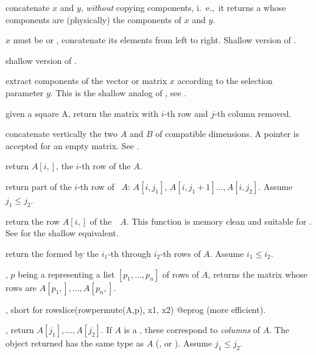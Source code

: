  concatenate $x$ and $y$, \emph{without}
copying components, i.~e.,~it returns a  whose components are
(physically) the components of $x$ and $y$.

$x$ must be  or , concatenate
its elements from left to right. Shallow version of .

 shallow version of .

 extract components
of the vector or matrix $x$ according to the selection parameter $y$.
This is the shallow analog of , see .

 given a square  A,
return the matrix with $i$-th row and $j$-th column removed.

 concatenate vertically the two  $A$
and $B$ of compatible dimensions. A  pointer is accepted for an
empty matrix. See .

 return $A[i,]$, the $i$-th row of the 
$A$.

 return part of the $i$-th
row of ~$A$: $A[i,j_1]$, $A[i,j_1+1]\dots,A[i,j_2]$. Assume $j_1
\leq j_2$.

 return the row $A[i,]$ of
the~~$A$. This function is memory clean and suitable for
. See  for the shallow equivalent.

 return the 
formed by the $i_1$-th through $i_2$-th rows of  $A$. Assume $i_1
\leq i_2$.

, $p$ being a 
representing a list $[p_1,\dots,p_n]$ of rows of  $A$, returns the
matrix whose rows are $A[p_1,],\dots, A[p_n,]$.

, short for
\bprog
  rowslice(rowpermute(A,p), x1, x2)
@eprog\noindent
(more efficient).

, return $A[j_1], \dots,
A[j_2]$. If $A$ is a , these correspond to \emph{columns} of $A$.
The object returned has the same type as $A$ (,  or
). Assume $j_1 \leq j_2$.


